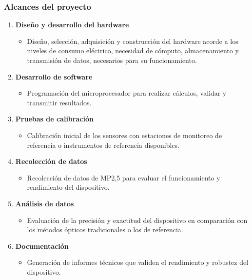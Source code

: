 \documentclass[aspectratio=169]{beamer}
\begin{document}
\begin{frame}
	\frametitle{Alcances del proyecto}
	
	\begin{enumerate}
		\item \textbf{Diseño y desarrollo del hardware}
		\begin{itemize}
			\item Diseño, selección, adquisición y construcción del hardware acorde a los niveles de consumo eléctrico, necesidad de cómputo, almacenamiento y transmisión de datos, necesarios para su funcionamiento.  
		\end{itemize}
		
		\item \textbf{Desarrollo de software}
		\begin{itemize}
			\item Programación del microprocesador para realizar cálculos, validar y transmitir resultados.
		\end{itemize}
		
		\item \textbf{Pruebas de calibración}
		\begin{itemize}
			\item Calibración inicial de los sensores con estaciones de monitoreo de referencia o instrumentos de referencia disponibles.
		\end{itemize}
		
		\item \textbf{Recolección de datos}
		\begin{itemize}
			\item Recolección de datos de MP2,5 para evaluar el funcionamiento y rendimiento del dispositivo.
		\end{itemize}
		
		\item \textbf{Análisis de datos}
		\begin{itemize}
			\item Evaluación de la precisión y exactitud del dispositivo en comparación con los métodos ópticos tradicionales o los de referencia.
		\end{itemize}
		
		\item \textbf{Documentación}
		\begin{itemize}
			\item Generación de informes técnicos que validen el rendimiento y robustez del dispositivo.
		\end{itemize}
		
	\end{enumerate}
	
\end{frame}
\end{document}
